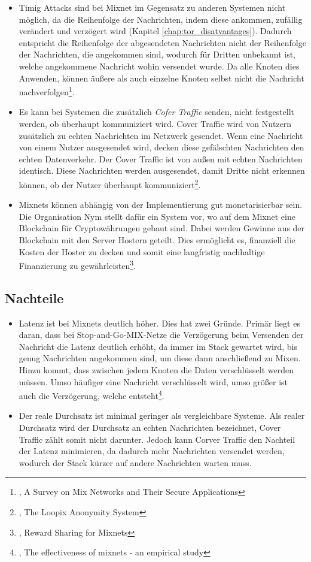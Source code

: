 \begin{itemize}
    \item Timig Attacks sind bei Mixnet im Gegensatz zu anderen Systemen nicht möglich, da die Reihenfolge der Nachrichten, indem diese ankommen, zufällig verändert und verzögert wird (Kapitel \ref{chap:tor_disatvantages}). Dadurch entspricht die Reihenfolge der abgesendeten Nachrichten nicht der Reihenfolge der Nachrichten, die angekommen sind, wodurch für Dritten unbekannt ist, welche angekommene Nachricht wohin versendet wurde. Da alle Knoten dies Anwenden, können äußere als auch einzelne Knoten selbst nicht die Nachricht nachverfolgen\footnote{\cite{MixNetworksSecureApplications}, A Survey on Mix Networks and Their Secure Applications}.
    \item Es kann bei Systemen die zusätzlich \textit{Cofer Traffic} senden, nicht festgestellt werden, ob überhaupt kommuniziert wird. Cover Traffic wird von Nutzern zusätzlich zu echten Nachrichten im Netzwerk gesendet. Wenn eine Nachricht von einem Nutzer ausgesendet wird, decken diese gefälschten Nachrichten den echten Datenverkehr. Der Cover Traffic ist von außen mit echten Nachrichten identisch. Diese Nachrichten werden ausgesendet, damit Dritte nicht erkennen können, ob der Nutzer überhaupt kommuniziert\footnote{\cite{LoopixAnonymitySystem}, The Loopix Anonymity System}.
    \item Mixnets können abhängig von der Implementierung gut monetarisierbar sein. Die Organisation Nym stellt dafür ein System vor, wo auf dem Mixnet eine Blockchain für Cryptowährungen gebaut sind. Dabei werden Gewinne aus der Blockchain mit den Server Hostern geteilt. Dies ermöglicht es, finanziell die Kosten der Hoster zu decken und somit eine langfristig nachhaltige Finanzierung zu gewährleisten\footnote{\cite{RewardSharingForMixnets}, Reward Sharing for Mixnets}.
\end{itemize}

\subsection{Nachteile}
\label{chap:mixnet_disadvantages}

\begin{itemize}
    \item Latenz ist bei Mixnets deutlich höher. Dies hat zwei Gründe. Primär liegt es daran, dass bei Stop-and-Go-MIX-Netze die Verzögerung beim Versenden der Nachricht die Latenz deutlich erhöht, da immer im Stack gewartet wird, bis genug Nachrichten angekommen sind, um diese dann anschließend zu Mixen. Hinzu kommt, dass zwischen jedem Knoten die Daten verschlüsselt werden müssen. Umso häufiger eine Nachricht verschlüsselt wird, umso größer ist auch die Verzögerung, welche entsteht\footnote{\cite{EffectivenessOfMixnets}, The effectiveness of mixnets - an empirical study}.
    \item Der reale Durchsatz ist minimal geringer als vergleichbare Systeme. Als realer Durchsatz wird der Durchsatz an echten Nachrichten bezeichnet, Cover Traffic zählt somit nicht darunter. Jedoch kann Corver Traffic den Nachteil der Latenz minimieren, da dadurch mehr Nachrichten versendet werden, wodurch der Stack kürzer auf andere Nachrichten warten muss.
\end{itemize}
